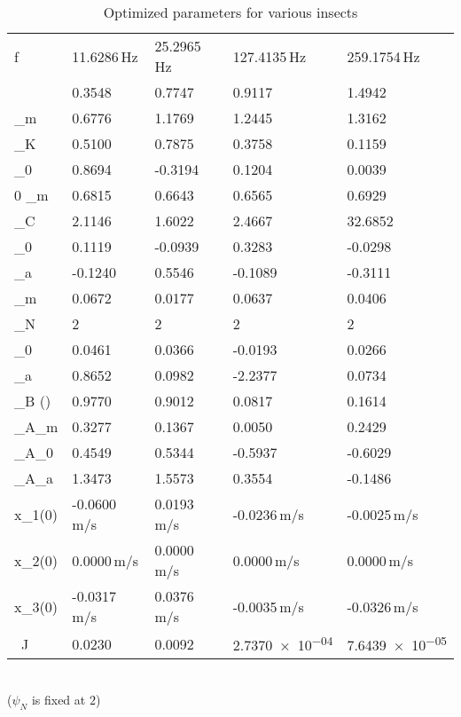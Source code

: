 \documentclass[10pt]{article}
\begin{document}
\begin{table}[h!]
	\caption{Optimized parameters for various insects}\label{tab:hover_insect_params}
	\begin{center}
		\begin{tabular}{|m|m|m|m|m|}
			\hline
			\text{Parameters} & \text{Monarch} & \text{Hawkmoth} & \text{Bumblebee} & \text{Fruitfly}\\\hline
			f & 11.6286\,\si{Hz} & 25.2965\,\si{Hz} & 127.4135\,\si{Hz} & 259.1754\,\si{Hz} \\
			\beta & 0.3548 & 0.7747 & 0.9117 & 1.4942 \\
			\phi_m & 0.6776 & 1.1769 & 1.2445 & 1.3162 \\
			\phi_K & 0.5100 & 0.7875 & 0.3758 & 0.1159 \\
			\phi_0 & 0.8694 & -0.3194 & 0.1204 & 0.0039 \\0
			\theta_m & 0.6815 & 0.6643 & 0.6565 & 0.6929 \\
			\theta_C & 2.1146 & 1.6022 & 2.4667 & 32.6852 \\
			\theta_0 & 0.1119 & -0.0939 & 0.3283 & -0.0298 \\
			\theta_a & -0.1240 & 0.5546 & -0.1089 & -0.3111 \\
			\psi_m & 0.0672 & 0.0177 & 0.0637 & 0.0406 \\
			\psi_N & 2 & 2 & 2 & 2\\
			\psi_0 & 0.0461 & 0.0366 & -0.0193 & 0.0266 \\
			\psi_a & 0.8652 & 0.0982 & -2.2377 & 0.0734 \\
			\theta_B (\text{fixed}) & 0.9770 & 0.9012 & 0.0817 & 0.1614 \\
			\theta_{A_m} & 0.3277 & 0.1367 & 0.0050 & 0.2429 \\
			\theta_{A_0} & 0.4549 & 0.5344 & -0.5937 & -0.6029 \\
			\theta_{A_a} & 1.3473 & 1.5573 & 0.3554 & -0.1486 \\
			\dot x_1(0) & -0.0600\,\si{m/s} & 0.0193\,\si{m/s} & -0.0236\,\si{m/s} & -0.0025\,\si{m/s} \\
			\dot x_2(0) & 0.0000\,\si{m/s} & 0.0000\,\si{m/s} & 0.0000\,\si{m/s} & 0.0000\,\si{m/s} \\
			\dot x_3(0) & -0.0317\,\si{m/s} & 0.0376\,\si{m/s} & -0.0035\,\si{m/s} & -0.0326\,\si{m/s} \\\hline
			\text{Optimized}\ J & 0.0230 & 0.0092 & \num{2.7370e-04} & \num{7.6439e-05} \\\hline
		\end{tabular}\\[0.1cm]
		($ \psi_N $ is fixed at $ 2 $)
	\end{center}
\end{table}
%
\end{document}
